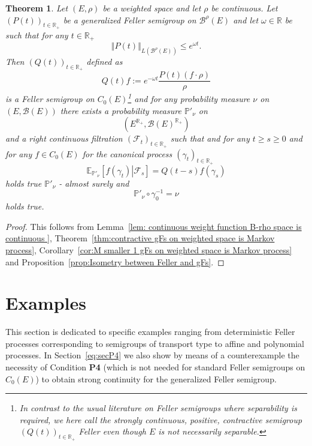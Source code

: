 \documentclass[a4paper,12pt]{article}
\newtheorem{theorem}{Theorem}[section]
\theoremstyle{definition}
\theoremstyle{remark}
\numberwithin{equation}{section}
\numberwithin{theorem}{section}
\begin{document}
\begin{theorem}
\label{thm:extended Feller process is extended Feller process} Let
$\left(E,\rho\right)$ be a weighted space and let $\rho$ be continuous.
Let $\left(P(t)\right)_{t\in\mathbb{R}_{+}}$ be a generalized Feller
semigroup on $\mathcal{\mathscr{B}}^{\rho}(E)$ and let $\omega\in\mathbb{R}$
be such that for any $t\in\mathbb{R}_{+}$
\[
\left\Vert P(t)\right\Vert _{L(\mathcal{\mathscr{B}}^{\rho}(E))}\leq e^{\omega t}.
\]
 Then $\left(Q(t)\right)_{t\in\mathbb{R}_{+}}$ defined as 
\[
Q(t)f:=e^{-\omega t}\frac{P\left(t\right)\left(f\cdot\rho\right)}{\rho}
\]
is a 
Feller semigroup on $C_{0}(E)$\footnote{In contrast to the usual literature on Feller semigroups  where  separability is required,  we here call the strongly continuous, positive, contractive semigroup   $(Q(t))_{t \in \mathbb{R}_{+}}$ \emph{Feller}  even  though $E$ is not necessarily separable.} 
and for any probability measure $\nu$ on $\left(E,\mathcal{B}(E)\right)$
there exists a probability measure $\mathbb{P}'_{\nu}$ on
\[
\left(E^{\mathbb{R}_{+}},\mathcal{B}(E)^{\mathbb{R}_{+}}\right)
\]
and a right continuous filtration $\left(\mathcal{F}_{t}\right)_{t\in\mathbb{R}_{+}}$
such that and for any $t\geq s\geq0$ and for any $f\in C_{0}(E)$
for the canonical process $\left(\gamma_{t}\right)_{t\in\mathbb{R}_{+}}$
\begin{equation}
\mathbb{E}_{\mathbb{P}'_{\nu}}\left[\left.f(\gamma_{t})\right|\mathcal{F}_{s}\right]=Q(t-s)f(\gamma_{s})\label{eq:extended Feller process for C_0}
\end{equation}
holds true $\mathbb{P}'_{\nu}$ - almost surely and 
\[
\mathbb{P}'_{\nu}\circ\gamma_{\text{0}}^{-1}=\nu
\]
holds true. 
\end{theorem}

\begin{proof}
This follows from Lemma~\ref{lem: continuous weight function B-rho space is continuous }, 
Theorem~\ref{thm:contractive gFs on weighted space is Markov process}, Corollary~\ref{cor:M smaller 1 gFs on weighted space is Markov process}
and Proposition~\ref{prop:Isometry between Feller and gFs}. 
\end{proof}



\section{Examples}

This section is dedicated to specific examples ranging from deterministic Feller processes corresponding to semigroups of transport type to affine and polynomial processes.
In Section~\ref{eq:secP4} we also show by means of a counterexample the necessity of Condition \textbf{P4} (which is not needed for standard Feller semigroups on $C_0(E)$) to obtain strong continuity for the generalized Feller semigroup. 
\end{document}
